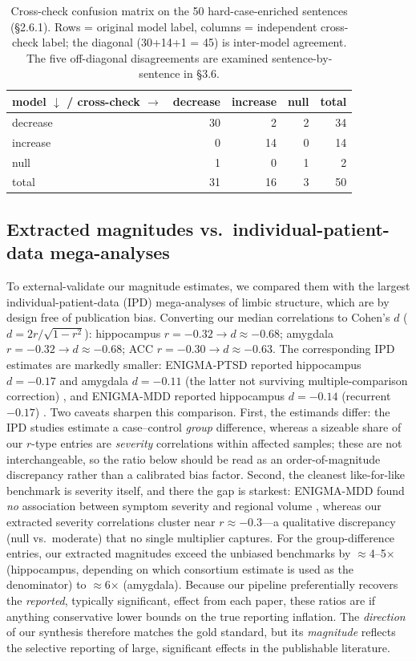 \documentclass[11pt]{article}
\begin{document}
\begin{table}[t]
\centering
\caption{Cross-check confusion matrix on the 50 hard-case-enriched sentences
(\S2.6.1). Rows = original model label, columns = independent cross-check label;
the diagonal (30+14+1 = 45) is inter-model agreement. The five off-diagonal
disagreements are examined sentence-by-sentence in \S3.6.}
\label{tab:crosscheck}
\begin{tabular}{lrrrr}
\toprule
model $\downarrow$ / cross-check $\rightarrow$ & decrease & increase & null & total \\
\midrule
decrease & 30 & 2 & 2 & 34 \\
increase & 0 & 14 & 0 & 14 \\
null & 1 & 0 & 1 & 2 \\
\midrule
total & 31 & 16 & 3 & 50 \\
\bottomrule
\end{tabular}
\end{table}

\subsection{Extracted magnitudes vs.\ individual-patient-data mega-analyses}
To external-validate our magnitude estimates, we compared them with the largest
individual-patient-data (IPD) mega-analyses of limbic structure, which are by
design free of publication bias. Converting our median correlations to Cohen's
$d$ ($d = 2r/\sqrt{1-r^2}$): hippocampus $r=-0.32 \to d\approx-0.68$; amygdala
$r=-0.32 \to d\approx-0.68$; ACC $r=-0.30 \to d\approx-0.63$. The corresponding
IPD estimates are markedly smaller: ENIGMA-PTSD reported hippocampus $d=-0.17$
and amygdala $d=-0.11$ (the latter not surviving multiple-comparison correction)
\cite{logue2018}, and ENIGMA-MDD reported hippocampus $d=-0.14$ (recurrent
$-0.17$) \cite{schmaal2016}. Two caveats sharpen this comparison. First, the
estimands differ: the IPD studies estimate a case--control \emph{group}
difference, whereas a sizeable share of our $r$-type entries are
\emph{severity} correlations within affected samples; these are not
interchangeable, so the ratio below should be read as an order-of-magnitude
discrepancy rather than a calibrated bias factor. Second, the cleanest
like-for-like benchmark is severity itself, and there the gap is starkest:
ENIGMA-MDD found \emph{no} association between symptom severity and regional
volume \cite{schmaal2016}, whereas our extracted severity correlations cluster
near $r\approx-0.3$---a qualitative discrepancy (null vs.\ moderate) that no
single multiplier captures. For the group-difference entries, our extracted
magnitudes exceed the unbiased benchmarks by $\approx$4--5$\times$ (hippocampus,
depending on which consortium estimate is used as the denominator) to
$\approx$6$\times$ (amygdala). Because our pipeline preferentially recovers the
\emph{reported}, typically significant, effect from each paper, these ratios are
if anything conservative lower bounds on the true reporting inflation. The
\emph{direction} of our synthesis therefore matches the gold standard, but its
\emph{magnitude} reflects the selective reporting of large, significant effects
in the publishable literature.
\end{document}
